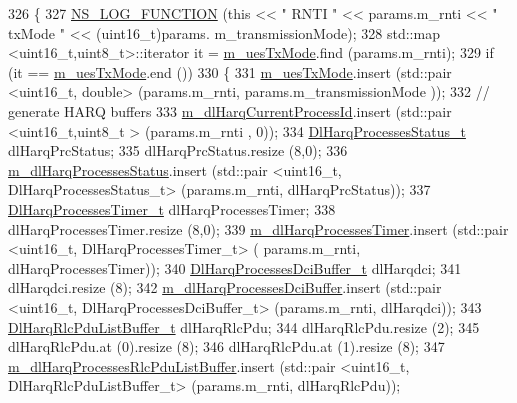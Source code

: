 \begin{DoxyCode}
326 \{
327   \hyperlink{log-macros-disabled_8h_a90b90d5bad1f39cb1b64923ea94c0761}{NS\_LOG\_FUNCTION} (\textcolor{keyword}{this} << \textcolor{stringliteral}{" RNTI "} << params.m\_rnti << \textcolor{stringliteral}{" txMode "} << (uint16\_t)params.
      m\_transmissionMode);
328   std::map <uint16\_t,uint8\_t>::iterator it = \hyperlink{classns3_1_1TdBetFfMacScheduler_a4488d2d9dc706b42ef06e493332042cd}{m\_uesTxMode}.find (params.m\_rnti);
329   \textcolor{keywordflow}{if} (it == \hyperlink{classns3_1_1TdBetFfMacScheduler_a4488d2d9dc706b42ef06e493332042cd}{m\_uesTxMode}.end ())
330     \{
331       \hyperlink{classns3_1_1TdBetFfMacScheduler_a4488d2d9dc706b42ef06e493332042cd}{m\_uesTxMode}.insert (std::pair <uint16\_t, double> (params.m\_rnti, params.m\_transmissionMode
      ));
332       \textcolor{comment}{// generate HARQ buffers}
333       \hyperlink{classns3_1_1TdBetFfMacScheduler_ac0ed078aaa3bb69134023425a66ff84a}{m\_dlHarqCurrentProcessId}.insert (std::pair <uint16\_t,uint8\_t > (params.m\_rnti
      , 0));
334       \hyperlink{namespacens3_a457b3571b67ff17d042e9894e90e2ce2}{DlHarqProcessesStatus\_t} dlHarqPrcStatus;
335       dlHarqPrcStatus.resize (8,0);
336       \hyperlink{classns3_1_1TdBetFfMacScheduler_af9f2ffd80c6d473a5ccee8fb153d40f6}{m\_dlHarqProcessesStatus}.insert (std::pair <uint16\_t, DlHarqProcessesStatus\_t> 
      (params.m\_rnti, dlHarqPrcStatus));
337       \hyperlink{namespacens3_a39413ade536de4b1c82d6c0074cc703e}{DlHarqProcessesTimer\_t} dlHarqProcessesTimer;
338       dlHarqProcessesTimer.resize (8,0);
339       \hyperlink{classns3_1_1TdBetFfMacScheduler_a6421f37924ac8b08b528aec9e7386678}{m\_dlHarqProcessesTimer}.insert (std::pair <uint16\_t, DlHarqProcessesTimer\_t> (
      params.m\_rnti, dlHarqProcessesTimer));
340       \hyperlink{namespacens3_af25599bf8f9f564075c005759c9af18c}{DlHarqProcessesDciBuffer\_t} dlHarqdci;
341       dlHarqdci.resize (8);
342       \hyperlink{classns3_1_1TdBetFfMacScheduler_a94ed0382052c7b9665c5f04bce88fe6e}{m\_dlHarqProcessesDciBuffer}.insert (std::pair <uint16\_t,
       DlHarqProcessesDciBuffer\_t> (params.m\_rnti, dlHarqdci));
343       \hyperlink{namespacens3_a4c0cbd1e72f1c667f8b5879655f13210}{DlHarqRlcPduListBuffer\_t} dlHarqRlcPdu;
344       dlHarqRlcPdu.resize (2);
345       dlHarqRlcPdu.at (0).resize (8);
346       dlHarqRlcPdu.at (1).resize (8);
347       \hyperlink{classns3_1_1TdBetFfMacScheduler_a066bceddaca3ed4a25974ada3aba3028}{m\_dlHarqProcessesRlcPduListBuffer}.insert (std::pair <uint16\_t,
       DlHarqRlcPduListBuffer\_t> (params.m\_rnti, dlHarqRlcPdu));

\end{DoxyCode}
